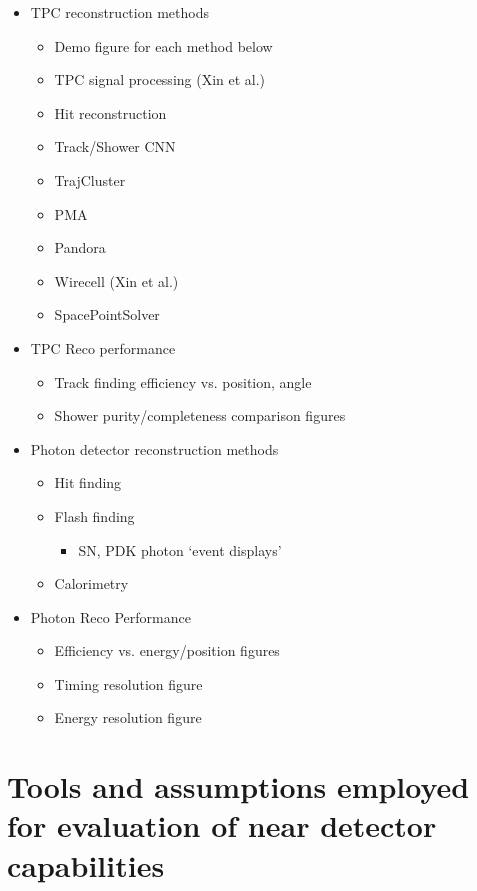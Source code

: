 \begin{itemize}
\item TPC reconstruction methods
\begin{itemize}
\item Demo figure for each method below
\item TPC signal processing (Xin et al.)
\item Hit reconstruction
\item Track/Shower CNN
\item TrajCluster
\item PMA
\item Pandora
\item Wirecell (Xin et al.)
\item SpacePointSolver
\end{itemize}
\item TPC Reco performance
\begin{itemize} 
\item Track finding efficiency vs. position, angle
\item Shower purity/completeness comparison figures 
\end{itemize}
\item Photon detector reconstruction methods
\begin{itemize}
\item Hit finding
\item Flash finding
\begin{itemize} \item SN, PDK photon `event displays' \end{itemize}
\item Calorimetry
\end{itemize}
\item Photon Reco Performance
\begin{itemize}
\item Efficiency vs. energy/position figures
\item Timing resolution figure
\item Energy resolution figure
\end{itemize}
\end{itemize}


\section{Tools and assumptions employed for evaluation of near detector capabilities}
\label{sec:tools-nd-eval}